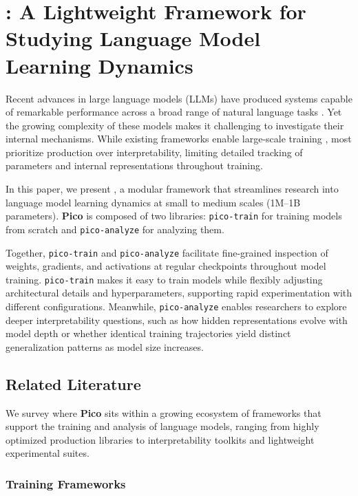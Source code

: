 \chapter{\picosupabig: A Lightweight Framework for Studying Language Model Learning Dynamics}
\label{chapter:Pic}

Recent advances in large language models (LLMs) have produced systems capable of remarkable performance across a broad range of natural language tasks \citep{hendrycks2021mmlu, cobbe2021gsm8k, srivastava2023bigbench}. Yet the growing complexity of these models makes it challenging to investigate their internal mechanisms. While existing frameworks enable large-scale training \citep{rasley2020deepspeed, narayanan2021megatron}, most prioritize production over interpretability, limiting detailed tracking of parameters and internal representations throughout training.


In this paper, we present \pico, a modular framework that streamlines research into language model learning dynamics at small to medium scales (1M--1B parameters). \textbf{Pico} is composed of two libraries: \texttt{pico-train} for training models from scratch and \texttt{pico-analyze} for analyzing them. 

Together, \texttt{pico-train} and \texttt{pico-analyze} facilitate fine-grained inspection of weights, gradients, and activations at regular checkpoints throughout model training. \texttt{pico-train} makes it easy to train models while flexibly adjusting architectural details and hyperparameters, supporting rapid experimentation with different configurations. Meanwhile, \texttt{pico-analyze} enables researchers to explore deeper interpretability questions, such as how hidden representations evolve with model depth or whether identical training trajectories yield distinct generalization patterns as model size increases.


\section{Related Literature}
\label{sec:related}

We survey where \textbf{Pico} sits within a growing ecosystem of frameworks that support the training and analysis of language models, ranging from highly optimized production libraries to interpretability toolkits and lightweight experimental suites. 

\subsection{Training Frameworks}

